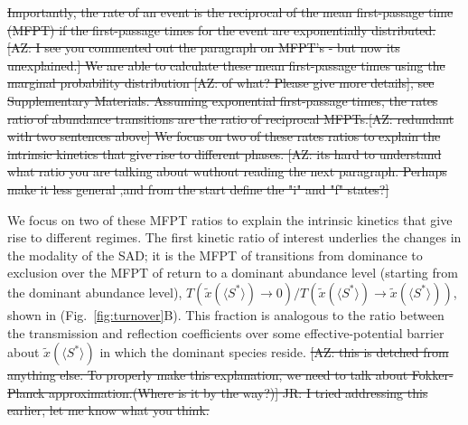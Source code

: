 \documentclass[9pt,twocolumn,twoside,lineno]{pnas-new}
\begin{document}
\st{
Importantly, the rate of an event is the reciprocal of the mean first-passage time (MFPT) if the first-passage times for the event are exponentially distributed. [AZ: I see you commented out the paragraph on MFPT's - but now its unexplained.]
We are able to calculate these mean first-passage times using the marginal probability distribution [AZ: of what? Please give more details], see Supplementary Materials.
Assuming exponential first-passage times, the rates ratio of abundance transitions are the ratio of reciprocal MFPTs.[AZ: redundant with two sentences above]
We focus on two of these rates ratios to explain the intrinsic kinetics that give rise to different phases. [AZ: its hard to understand what ratio you are talking about wuthout reading the next paragraph. Perhaps make it less general ,and from the start define the "i" and "f" states?]}

We focus on two of these MFPT ratios to explain the intrinsic kinetics that give rise to different regimes.
The first kinetic ratio of interest underlies the changes in the modality of the SAD; it is the MFPT of transitions from dominance to exclusion over the MFPT of return to a dominant abundance level (starting from the dominant abundance level), $T(\tilde{x}(\langle S^* \rangle )\rightarrow 0) / T(\tilde{x}(\langle S^* \rangle )\rightarrow \tilde{x}(\langle S^* \rangle ))$, shown in (Fig.~\ref{fig:turnover}B).
This fraction is analogous to the ratio between the transmission and reflection coefficients over some effective-potential barrier about $\tilde{x}(\langle S^* \rangle )$ in which the dominant species reside. \st{[AZ: this is detched from anything else. To properly make this explanation, we need to talk about Fokker-Planck approximation.(Where is it by the way?)] JR: I tried addressing this earlier, let me know what you think.}
\end{document}
